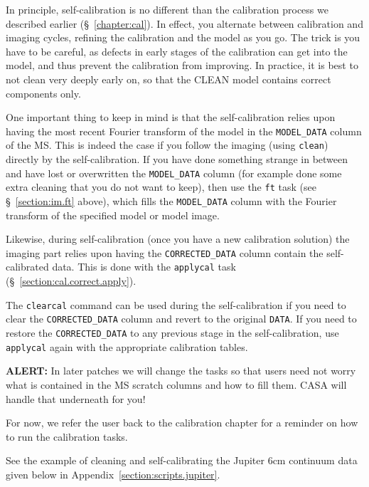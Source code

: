 In principle, self-calibration is no different than the calibration
process we described earlier (\S~\ref{chapter:cal}).  In effect, you
alternate between calibration and imaging cycles, refining the calibration
and the model as you go.  The trick is you have to be careful, as defects
in early stages of the calibration can get into the model, and thus
prevent the calibration from improving.  In practice, it is best to
not clean very deeply early on, so that the CLEAN model contains
correct components only.  

One important thing to keep in mind is that the self-calibration
relies upon having the most recent Fourier transform of the
model in the {\tt MODEL\_DATA} column of the MS.  This is indeed
the case if you follow the imaging (using {\tt clean})
directly by the self-calibration.  If you have done something strange
in between and have lost or overwritten the {\tt MODEL\_DATA} column
(for example done some extra cleaning that you do not want to keep),
then use the {\tt ft} task (see \S~\ref{section:im.ft} above), which 
fills the {\tt MODEL\_DATA} column with the Fourier transform of the
specified model or model image.  

Likewise, during self-calibration (once you have a new calibration
solution) the imaging part
relies upon having the {\tt CORRECTED\_DATA} column contain
the self-calibrated data.  This is done with the {\tt applycal}
task (\S~\ref{section:cal.correct.apply}).  

The {\tt clearcal} command can be used during the self-calibration if
you need to clear the {\tt CORRECTED\_DATA} column and revert to the
original {\tt DATA}.  If you need to restore the {\tt CORRECTED\_DATA}
to any previous stage in the self-calibration, use {\tt applycal}
again with the appropriate calibration tables.

{\bf ALERT:} In later patches we
will change the tasks so that users need not worry what is contained in
the MS scratch columns and how to fill them.  CASA will handle that 
underneath for you!

For now, we refer the user back to the calibration chapter for
a reminder on how to run the calibration tasks. 

See the example of cleaning and self-calibrating the Jupiter 6cm continuum
data given below in Appendix~\ref{section:scripts.jupiter}.  

